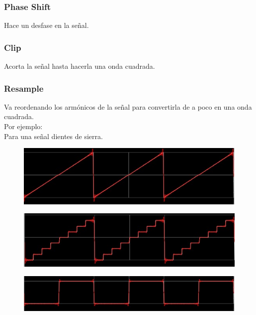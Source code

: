 \documentclass[../main.tex]{subfiles}
\begin{document}
	\subsubsection{Phase Shift}
	Hace un desfase en la señal.

	\subsubsection{Clip}
	Acorta la señal hasta hacerla una onda cuadrada.

	\subsubsection{Resample}
	Va reordenando los armónicos de la señal para convertirla de a poco en una onda cuadrada.\\
	Por ejemplo:\\
	Para una señal dientes de sierra.
	\begin{figure}[H]
		\includegraphics[width= 0.6 \textwidth]{imagen10.png}
		\centering
	\end{figure}
	\begin{figure}[H]
		\includegraphics[width= 0.6 \textwidth]{imagen11.png}
		\centering
	\end{figure}
	\begin{figure}[H]
		\includegraphics[width= 0.6 \textwidth]{imagen12.png}
		\centering
	\end{figure}
\end{document}
